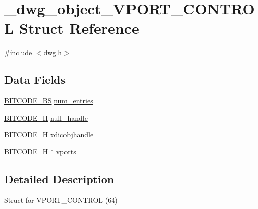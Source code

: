 \hypertarget{struct__dwg__object__VPORT__CONTROL}{\section{\-\_\-dwg\-\_\-object\-\_\-\-V\-P\-O\-R\-T\-\_\-\-C\-O\-N\-T\-R\-O\-L \-Struct \-Reference}
\label{struct__dwg__object__VPORT__CONTROL}
}


{\ttfamily \#include $<$dwg.\-h$>$}

\subsection*{\-Data \-Fields}
\begin{DoxyCompactItemize}
\item 
\hyperlink{dwg_8h_a94297606fbd4a4ff97e8add284af0809}{\-B\-I\-T\-C\-O\-D\-E\-\_\-\-B\-S} \hyperlink{struct__dwg__object__VPORT__CONTROL_a1634eb41d036fcec3c830731739385d7}{num\-\_\-entries}
\item 
\hyperlink{dwg_8h_a7c700e94e047a97ba8c24bdfe4029dc3}{\-B\-I\-T\-C\-O\-D\-E\-\_\-\-H} \hyperlink{struct__dwg__object__VPORT__CONTROL_a8b6bdb88a56bbfb0150053714e4a51ce}{null\-\_\-handle}
\item 
\hyperlink{dwg_8h_a7c700e94e047a97ba8c24bdfe4029dc3}{\-B\-I\-T\-C\-O\-D\-E\-\_\-\-H} \hyperlink{struct__dwg__object__VPORT__CONTROL_a2a0dc8a4a0f7a401dbd8964725aca2ab}{xdicobjhandle}
\item 
\hyperlink{dwg_8h_a7c700e94e047a97ba8c24bdfe4029dc3}{\-B\-I\-T\-C\-O\-D\-E\-\_\-\-H} $\ast$ \hyperlink{struct__dwg__object__VPORT__CONTROL_a8bb46c09b3880254c8a5706c1d7f1a59}{vports}
\end{DoxyCompactItemize}


\subsection{\-Detailed \-Description}
\-Struct for \-V\-P\-O\-R\-T\-\_\-\-C\-O\-N\-T\-R\-O\-L (64) 

